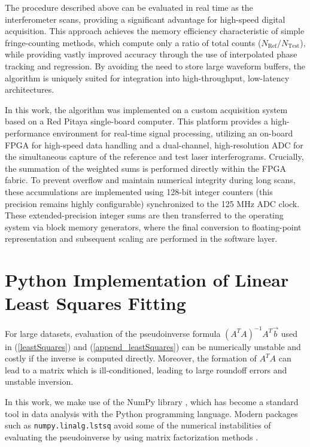 The procedure described above can be evaluated in real time as the interferometer scans, providing a significant advantage for high-speed digital acquisition. This approach achieves the memory efficiency characteristic of simple fringe-counting methods, which compute only a ratio of total counts ($N_\mathrm{Ref}/N_\mathrm{Test}$), while providing vastly improved accuracy through the use of interpolated phase tracking and regression. By avoiding the need to store large waveform buffers, the algorithm is uniquely suited for integration into high-throughput, low-latency architectures.

In this work, the algorithm was implemented on a custom acquisition system based on a Red Pitaya single-board computer. This platform provides a high-performance environment for real-time signal processing, utilizing an on-board FPGA for high-speed data handling and a dual-channel, high-resolution ADC for the simultaneous capture of the reference and test laser interferograms. Crucially, the summation of the weighted sums is performed directly within the FPGA fabric. To prevent overflow and maintain numerical integrity during long scans, these accumulations are implemented using 128-bit integer counters (this precision remains highly configurable) synchronized to the 125 MHz ADC clock. These extended-precision integer sums are then transferred to the operating system via block memory generators, where the final conversion to floating-point representation and subsequent scaling are performed in the software layer.

\section{Python Implementation of Linear Least Squares Fitting}
For large datasets, evaluation of the pseudoinverse formula $(A^T A)^{-1}A^T \vec{b}$ used in (\ref{leastSquares}) and (\ref{append_leastSquares}) can be numerically unstable and costly if the inverse is computed directly. Moreover, the formation of $A^T A$ can lead to a matrix which is ill-conditioned, leading to large roundoff errors and unstable inversion.

In this work, we make use of the NumPy library \cite{numpy_citation}, which has become a standard tool in data analysis with the Python programming language. Modern packages such as \newline \texttt{numpy.linalg.lstsq} avoid some of the numerical instabilities of evaluating the pseudoinverse by using matrix factorization methods \cite{LAPACK}.

